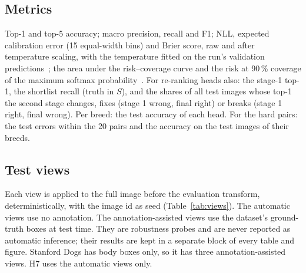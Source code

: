\documentclass[11pt,a4paper]{article}
\theoremstyle{plain}
\begin{document}
\subsection{Metrics}\label{sec:metrics}
Top-1 and top-5 accuracy; macro precision, recall and F1; NLL, expected calibration error (15 equal-width bins) and
Brier score, raw and after temperature scaling, with the temperature fitted on the run's validation
predictions~\citep{guo2017calibration,naeini2015bbq}; the area under the risk--coverage curve and the risk at 90\,\%
coverage of the maximum softmax probability~\citep{geifman2017selective}. For re-ranking heads also: the stage-1
top-1, the shortlist recall (truth in $S$), and the shares of all test images whose top-1 the second stage changes,
fixes (stage 1 wrong, final right) or breaks (stage 1 right, final wrong). Per breed: the test accuracy of each head.
For the hard pairs: the test errors within the 20 pairs and the accuracy on the test images of their breeds.

\subsection{Test views}\label{sec:views}
Each view is applied to the full image before the evaluation transform, deterministically, with the image id as seed
(Table~\ref{tab:views}). The automatic views use no annotation. The annotation-assisted views use the dataset's
ground-truth boxes at test time. They are robustness probes and are never reported as automatic inference; their
results are kept in a separate block of every table and figure. Stanford Dogs has body boxes only, so it has three
annotation-assisted views. H7 uses the automatic views only.
\end{document}
